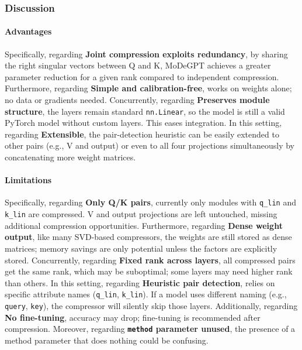 \subsubsection*{Discussion}

\paragraph{Advantages}

Specifically, regarding \textbf{Joint compression exploits redundancy}, by sharing the right singular vectors between Q and K, MoDeGPT achieves a greater parameter reduction for a given rank compared to independent compression. Furthermore, regarding \textbf{Simple and calibration-free}, works on weights alone; no data or gradients needed. Concurrently, regarding \textbf{Preserves module structure}, the layers remain standard \texttt{nn.Linear}, so the model is still a valid PyTorch model without custom layers. This eases integration. In this setting, regarding \textbf{Extensible}, the pair-detection heuristic can be easily extended to other pairs (e.g., V and output) or even to all four projections simultaneously by concatenating more weight matrices.


\paragraph{Limitations}

Specifically, regarding \textbf{Only Q/K pairs}, currently only modules with \texttt{q\_lin} and \texttt{k\_lin} are compressed. V and output projections are left untouched, missing additional compression opportunities. Furthermore, regarding \textbf{Dense weight output}, like many SVD-based compressors, the weights are still stored as dense matrices; memory savings are only potential unless the factors are explicitly stored. Concurrently, regarding \textbf{Fixed rank across layers}, all compressed pairs get the same rank, which may be suboptimal; some layers may need higher rank than others. In this setting, regarding \textbf{Heuristic pair detection}, relies on specific attribute names (\texttt{q\_lin}, \texttt{k\_lin}). If a model uses different naming (e.g., \texttt{query}, \texttt{key}), the compressor will silently skip those layers. Additionally, regarding \textbf{No fine-tuning}, accuracy may drop; fine-tuning is recommended after compression. Moreover, regarding \textbf{\texttt{method} parameter unused}, the presence of a method parameter that does nothing could be confusing.


